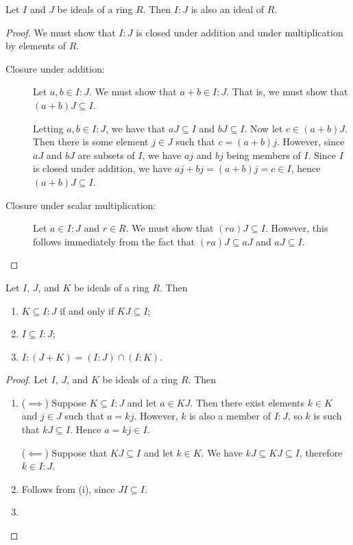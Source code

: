 \begin{proposition}
  Let $I$ and $J$ be ideals of a ring $R$.
  Then $I : J$ is also an ideal of $R$.
\end{proposition}
\begin{proof}
  We must show that $I : J$ is closed under addition and under multiplication by elements of $R$.
  \begin{description}
    \item[Closure under addition:]
      Let $a, b \in I : J$.
      We must show that $a + b \in I : J$.
      That is, we must show that $(a + b)J \subseteq I$.
      
      Letting $a, b \in I : J$, we have that $aJ \subseteq I$ and $bJ \subseteq I$.
      Now let $c \in (a + b)J$.
      Then there is some element $j \in J$ such that $c = (a + b)j$.
      However, since $aJ$ and $bJ$ are subsets of $I$, we have $aj$ and $bj$ being members of $I$.
      Since $I$ is closed under addition, we have $aj + bj = (a + b)j = c \in I$, hence $(a + b)J \subseteq I$.
    
    \item[Closure under scalar multiplication:]
      Let $a \in I : J$ and $r \in R$.
      We must show that $(ra)J \subseteq I$.
      However, this follows immediately from the fact that $(ra)J \subseteq aJ$ and $aJ \subseteq I$.
  \end{description}
\end{proof}

\begin{proposition}
  \label{prop_colon_ideal}
  Let $I$, $J$, and $K$ be ideals of a ring $R$. Then
  \begin{enumerate}[label=(\roman*)]
    \item $K \subseteq I : J$ if and only if $KJ \subseteq I$;
    \item $I \subseteq I : J$;
    \item $I : (J + K) = (I : J) \cap (I : K)$.
  \end{enumerate}
\end{proposition}
\begin{proof}
  Let $I$, $J$, and $K$ be ideals of a ring $R$. Then
  \begin{enumerate}[label=(\roman*)]
    \item
      ($\implies$)
      Suppose $K \subseteq I : J$ and let $a \in KJ$.
      Then there exist elements $k \in K$ and $j \in J$ such that $a = kj$.
      However, $k$ is also a member of $I : J$, so $k$ is such that $kJ \subseteq I$.
      Hence $a = kj \in I$.
      
      ($\impliedby$)
      Suppose that $KJ \subseteq I$ and let $k \in K$.
      We have $kJ \subseteq KJ \subseteq I$, therefore $k \in I : J$.
    \item
      Follows from (i), since $JI \subseteq I$.
    \item
  \end{enumerate}
\end{proof}


